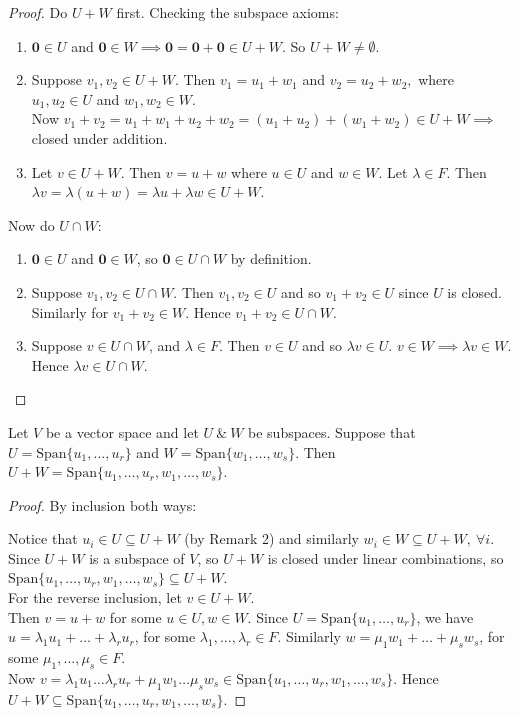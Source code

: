 \documentclass[twoside]{scrartcl}
\begin{document}
\begin{proof}
Do $U+W$ first. Checking the subspace axioms:
\begin{enumerate}
\item  $\mathbf{0} \in U$ and $\mathbf{0} \in W \implies \mathbf{0} = \mathbf{0} + \mathbf{0} \in U + W$. So $U + W \neq \emptyset$. 
\item Suppose $v_1, v_2 \in U + W$. Then $v_1 = u_1 + w_1$ and $v_2 = u_2 + w_2,$ where $u_1,u_2 \in U$ and $w_1, w_2 \in W$.\\

Now $v_1 + v_2 = u_1 + w_1 + u_2 + w_2 = (u_1 + u_2) + (w_1 + w_2) \in U + W \implies$ closed under addition.

\item Let $v \in U + W$. Then $v = u + w$ where $u \in U$ and $w \in W.$ Let $\lambda \in F$. Then $\lambda v = \lambda(u+w) = \lambda u + \lambda w \in U + W$.
\end{enumerate}

Now do $U \cap W$:
\begin{enumerate}
\item $\mathbf{0} \in U$ and $\mathbf{0} \in W$, so $\mathbf{0} \in U \cap W$ by definition.
\item Suppose $v_1, v_2 \in U \cap W.$ Then $v_1, v_2 \in U$ and so $v_1 + v_2 \in U$ since $U$ is closed. Similarly for $v_1 + v_2 \in W$. Hence $v_1 + v_2 \in U \cap W$. 
\item Suppose $v \in U \cap W$, and $\lambda \in F.$ Then $v \in U$ and so $\lambda v \in U$. $v \in W \implies \lambda v \in W.$ Hence $\lambda v \in U \cap W$.\qedhere 
\end{enumerate}
\end{proof}\vspace*{10pt}

\begin{proposition}Let 
 $V$ be a vector space and let $U ~\&~ W$ be subspaces. Suppose that $U = \text{Span}\{u_1,\dots,u_r\}$ and $W = \text{Span}\{w_1,\dots,w_s\}$. Then $U + W = \text{Span}\{u_1,\dots,u_r,w_1,\dots,w_s\}$. 
\end{proposition}
\begin{proof}
By inclusion both ways:

Notice that $u_i \in U \subseteq U + W$ (by Remark 2) and similarly $w_i \in W \subseteq U + W, ~\forall i$. Since $U + W$ is a subspace of $V$, so $U + W$ is closed under linear combinations, so $\text{Span}\{u_1,\dots,u_r,w_1,\dots,w_s\} \subseteq U + W.$\\

For the reverse inclusion, let $v \in U + W$.\\ Then $v = u + w$ for some $u \in U, w \in W$. Since $U = \text{Span}\{u_1,\dots,u_r\}$, we have $u = \lambda_1u_1 + \dots + \lambda_ru_r$, for some $\lambda_1,\dots,\lambda_r \in F$. Similarly $w = \mu_1w_1 + \dots + \mu_sw_s$, for some $\mu_1,\dots,\mu_s \in F$.\\

Now $v = \lambda_1u_1 \dots \lambda_ru_r + \mu_1w_1 \dots \mu_sw_s \in \text{Span}\{u_1,\dots,u_r,w_1,\dots,w_s\}$. Hence $U + W \subseteq \text{Span}\{u_1,\dots,u_r,w_1,\dots,w_s\}$.
\end{proof}
\end{document}
